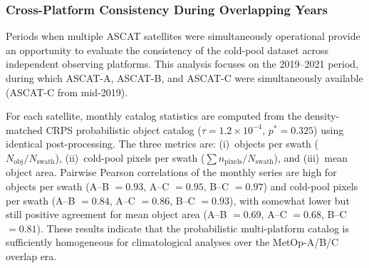 \subsubsection{Cross-Platform Consistency During Overlapping Years}

Periods when multiple ASCAT satellites were simultaneously operational provide an
opportunity to evaluate the consistency of the cold-pool dataset across independent
observing platforms. This analysis focuses on the 2019--2021 period, during which
ASCAT-A, ASCAT-B, and ASCAT-C were simultaneously available (ASCAT-C from mid-2019).

For each satellite, monthly catalog statistics are computed from the density-matched
CRPS probabilistic object catalog ($\tau=1.2\times10^{-4}$, $p^*=0.325$) using
identical post-processing. The three metrics are: (i)~objects per swath
($N_{\mathrm{obj}}/N_{\mathrm{swath}}$), (ii)~cold-pool pixels per swath
($\sum n_{\mathrm{pixels}}/N_{\mathrm{swath}}$), and (iii)~mean object area.
Pairwise Pearson correlations of the monthly series are high for objects per swath
(A--B $= 0.93$, A--C $= 0.95$,
B--C $= 0.97$) and cold-pool pixels per swath
(A--B $= 0.84$,
A--C $= 0.86$,
B--C $= 0.93$), with somewhat lower but still
positive agreement for mean object area
(A--B $= 0.69$, A--C $= 0.68$,
B--C $= 0.81$). These results indicate that the probabilistic
multi-platform catalog is sufficiently homogeneous for climatological analyses over
the MetOp-A/B/C overlap era.

